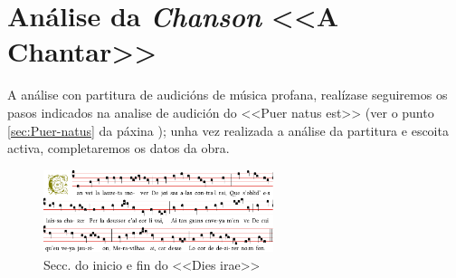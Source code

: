 %
%
\section{Análise da \textit{Chanson} <<A Chantar>>} \label{Can-vei}
%


A análise con partitura de audicións de música profana, realízase seguiremos os pasos indicados na analise de audición do <<Puer natus est>>  (ver o punto \ref{sec:Puer-natus} da páxina \pageref{sec:Puer-natus}); unha vez realizada a análise da partitura e escoita activa, completaremos os datos da obra.
\par
\vspace*{0.15cm}
%
\begin{figure}[h]
    \centering
    \includegraphics[width=0.60\textwidth]{figures/audicions/can-vei.pdf}
    \caption{Secc. do inicio e fin do <<Dies irae>>}
    \label{fig:dies-irae}
\end{figure}
%
%

%

